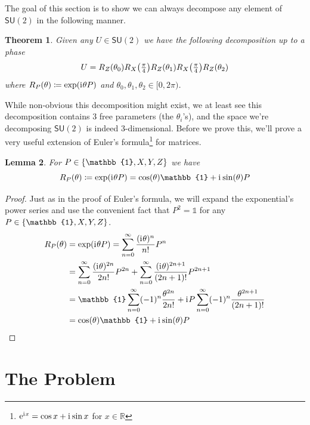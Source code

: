 \documentclass[12pt,dvipsnames]{article}
\newcommand{\SU}[1]{\mathsf{SU} (#1)}
\newcommand{\R}{\mathbb{R}}
\newcommand{\1}{\mathbb{1}}
\newcommand{\iu}{\mathrm{i}\mkern1mu}
\newcommand{\e}{\mathrm{e}}
\newcommand{\defeq}{\coloneqq}
\theoremstyle{plain}
\newtheorem{theorem}{Theorem}
\newtheorem{lem}[theorem]{Lemma}
\begin{document}
The goal of this section is to show we can always decompose any element of $\SU{2}$ in the following manner.
\begin{theorem}
    Given any $U\in\SU{2}$ we have the following decomposition up to a phase
    \begin{equation*}
        U = R_Z(\theta_0)R_X\qty(\tfrac{\pi}{4})R_Z(\theta_1)R_X\qty(\tfrac{\pi}{4})R_Z(\theta_2)
    \end{equation*}
    where $R_P(\theta) \defeq \exp(\iu \theta P)$ and $\theta_0, \theta_1, \theta_2\in[0, 2\pi)$. %
\end{theorem}
While non-obvious this decomposition might exist, we at least see this decomposition contains 3 free parameters (the $\theta_i$'s), and the space we're decomposing $\SU{2}$ is indeed 3-dimensional.
Before we prove this, we'll prove a very useful extension of Euler's formula\footnote{$\e^{\iu x} = \cos{x} + \iu\sin{x}$ for $x\in\R$} for matrices.
\begin{lem}
    For $P\in \qty{\1, X, Y, Z}$ we have
    \begin{equation*}
        R_P(\theta) \defeq \exp(\iu\theta P) = \cos(\theta) \1 + \iu\sin(\theta) P
    \end{equation*}
\end{lem}
\begin{proof}
    Just as in the proof of Euler's formula, we will expand the exponential's power series and use the convenient fact that $P^2 = \1$ for any $P\in\qty{\1, X, Y, Z}$.
    \begin{align*}
        R_P(\theta) & = \exp(\iu\theta P) = \sum_{n = 0}^\infty\frac{(\iu \theta)^n}{n!}P^n                                                     \\
                    & = \sum_{n = 0}^\infty\frac{(\iu \theta)^{2n}}{2n!}P^{2n} + \sum_{n = 0}^\infty\frac{(\iu \theta)^{2n+1}}{(2n+1)!}P^{2n+1} \\
                    & = \1\sum_{n = 0}^\infty (-1)^n\frac{\theta^{2n}}{2n!} + \iu P\sum_{n = 0}^\infty (-1)^n\frac{\theta^{2n+1}}{(2n+1)!}      \\
                    & = \cos(\theta)\1 + \iu\sin(\theta)P
    \end{align*}
\end{proof}




\section{The Problem}
\end{document}
